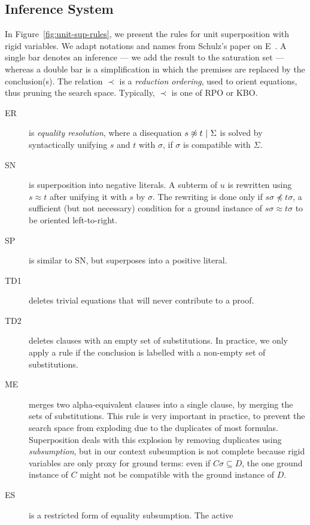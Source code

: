 \subsection{Inference System}

In Figure~\ref{fig:unit-sup-rules}, we present the  rules for unit superposition
with rigid variables.
We adapt notations and names from Schulz's paper on E~\cite{e_brainiac_prover}.
A single bar denotes an inference --- we add the result to the saturation set ---
whereas a double bar is a simplification in which the premises are
replaced by the conclusion(s).
The relation $\prec$ is a {\em reduction ordering}, used to orient equations,
thus pruning the search space.
Typically, $\prec$ is one of RPO or KBO.

\begin{description}
  \item[ER] is {\em equality resolution},
    where a disequation $s \not\approx t ~|~ \Sigma$
    is solved by syntactically unifying $s$ and $t$ with $\sigma$,
    if $\sigma$ is compatible with $\Sigma$.
  \item[SN] is superposition into negative literals. A subterm of $u$
    is rewritten using $s \approx t$ after unifying it with $s$
    by $\sigma$.
    The rewriting is done only if $s\sigma \not\preceq t\sigma$,
    a sufficient (but not necessary) condition for a
    ground instance of $s\sigma \approx t\sigma$
    to be oriented left-to-right.
  \item[SP] is similar to SN, but superposes into a positive literal.
  \item[TD1] deletes trivial equations that will never contribute to a proof.
  \item[TD2] deletes clauses with an empty set of substitutions.
    In practice, we only apply a rule if the conclusion is labelled with a
    non-empty set of substitutions.
  \item[ME] merges two alpha-equivalent clauses into a single clause,
    by merging the sets of substitutions.
    This rule is very important in practice, to prevent the search space
    from exploding due to the duplicates of most formulas.
    Superposition deals with this explosion by removing duplicates using
    {\em subsumption}, but in our context subsumption is not complete
    because rigid variables are only proxy for ground terms:
    even if $C\sigma \subseteq D$, the one ground instance of $C$ might not
    be compatible with the ground instance of $D$.
  \item[ES] is a restricted form of equality subsumption. The active

\end{description}
